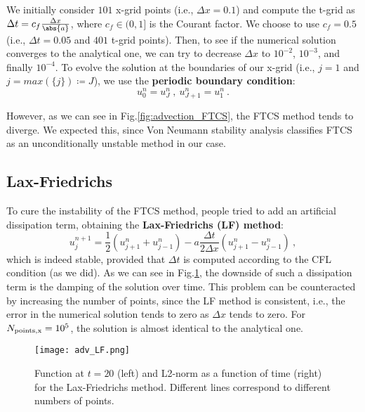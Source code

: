 We initially consider $101$ x-grid points (i.e., $\Delta x = 0.1$) and compute the t-grid as $\Delta t = c_f \frac{\Delta x}{\abs{a}}$, where $c_f \in (0,1]$ is the Courant factor. We choose to use $c_f=0.5$ (i.e., $\Delta t = 0.05$ and $401$ t-grid points). Then, to see if the numerical solution converges to the analytical one, we can try to decrease $\Delta x$ to $10^{-2}$, $10^{-3}$, and finally $10^{-4}$. To evolve the solution at the boundaries of our x-grid (i.e., $j=1$ and $j=max(\{j\})\coloneqq J$), we use the \textbf{periodic boundary condition}:
\begin{equation}
    u_0^n = u_J^n \:,\: u_{J+1}^n = u_1^n \:.
    \label{eq:periodic_bc}
\end{equation}

However, as we can see in Fig.\ref{fig:advection_FTCS}, the FTCS method tends to diverge. We expected this, since Von Neumann stability analysis classifies FTCS as an unconditionally unstable method in our case.




\vspace{4mm} 
\subsection{Lax-Friedrichs} \label{advection_LF}
To cure the instability of the FTCS method, people tried to add an artificial dissipation term, obtaining the \textbf{Lax-Friedrichs (LF) method}:
\begin{equation}
    u_j^{n+1} = \frac{1}{2} \left(u_{j+1}^n + u_{j-1}^n\right) - a\frac{\Delta t}{2\Delta x} \left(u_{j+1}^n - u_{j-1}^n\right) \:,
    \label{eq:LF}
\end{equation}
which is indeed stable, provided that $\Delta t$ is computed according to the CFL condition (as we did).
As we can see in Fig.\ref{fig:advection_LF}, the downside of such a dissipation term is the damping of the solution over time. This problem can be counteracted by increasing the number of points, since the LF method is consistent, i.e., the error in the numerical solution tends to zero as $\Delta x$ tends to zero. For $N_{\rm points, x} = 10^5$, the solution is almost identical to the analytical one.

\begin{figure}[h!]
    \centering
    \texttt{[image: adv\_LF.png]}
    \caption{\small Function at $t=20$ (left) and L2-norm as a function of time (right) for the Lax-Friedrichs method. Different lines correspond to different numbers of points.}
    \label{fig:advection_LF}
\end{figure}




